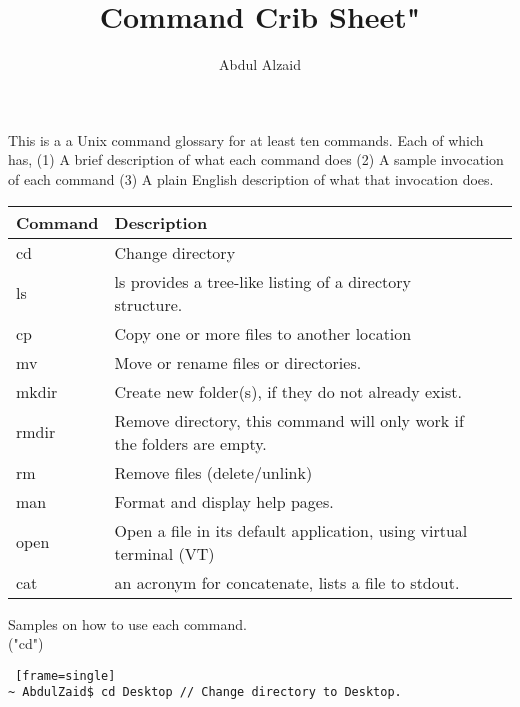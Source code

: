 \documentclass[12pt, oneside]{amsart}   	%
\title{Command Crib Sheet"}
\author{Abdul Alzaid}
\begin{document}
\maketitle
This is a a Unix command glossary for at least ten commands. Each of which has, (1) A brief description of what each command does (2) A sample invocation of each command (3) A plain English description of what that invocation does.


\begin{center}
    \begin{tabular}{| l | l | l | l |}
    \hline
    Command & Description  \\ \hline
    cd & Change directory  \\ \hline
    ls &  ls provides a tree-like listing of a directory structure.  \\ \hline
    cp & Copy one or more files to another location  \\ \hline
    mv & Move or rename files or directories.  \\ \hline
    mkdir & Create new folder(s), if they do not already exist.  \\ \hline
    rmdir & Remove directory, this command will only work if the folders are empty.  \\ \hline
    rm & Remove files (delete/unlink)  \\ \hline
    man & Format and display help pages.  \\ \hline
    open & Open a file in its default application, using virtual terminal (VT)  \\ \hline
    cat &  an acronym for concatenate, lists a file to stdout.  \\ \hline
        \end{tabular}
\end{center}

{\Large Samples on how to use each command.}\\

("cd")
\begin{lstlisting} [frame=single]
~ AbdulZaid$ cd Desktop // Change directory to Desktop.
 \end{lstlisting} 
 
\end{document}
